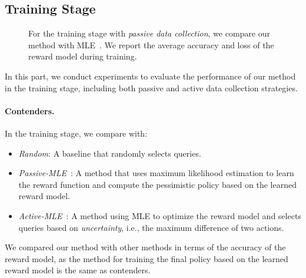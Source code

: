 \subsection{Training Stage}
\label{subsec:exp:training}

\begin{figure*}
    \begin{minipage}[t]{0.99\textwidth}
        \centering
        \hfill
        \hfill
        \hfill
    \end{minipage}
    \caption{For the training stage with \emph{passive data collection}, we compare our method with MLE~\citep{ICML'23:Zhu-Principled}. We report the average accuracy and loss of the reward model during training.}
    \label{fig:training_passive}
\end{figure*}

In this part, we conduct experiments to evaluate the performance of our method in the training stage, including both passive and active data collection strategies.

\paragraph{Contenders.} In the training stage, we compare with:
\begin{itemize}
  \item \emph{Random}: A baseline that randomly selects queries.
  \item \emph{Passive-MLE}~\citep{ICML'23:Zhu-Principled}: A method that uses maximum likelihood estimation to learn the reward function and compute the pessimistic policy based on the learned reward model.
  \item \emph{Active-MLE}~\citep{arXiv'24:Das-RLHF-active}: A method using MLE to optimize the reward model and selects queries based on \emph{uncertainty}, i.e., the maximum difference of two actions.
\end{itemize}
We compared our method with other methods in terms of the accuracy of the reward model, as the method for training the final policy based on the learned reward model is the same as contenders.

